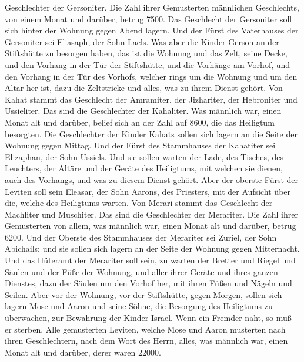 Geschlechter der Gersoniter.  Die Zahl ihrer Gemusterten
männlichen Geschlechts, von einem Monat und darüber, betrug 7500.
 Das Geschlecht der Gersoniter soll sich hinter der
Wohnung gegen Abend lagern.  Und der Fürst des
Vaterhauses der Gersoniter sei Eliasaph, der Sohn Laels. 
Was aber die Kinder Gerson an der Stiftshütte zu besorgen haben, das ist
die Wohnung und das Zelt, seine Decke, und den Vorhang in der Tür der
Stiftshütte,  und die Vorhänge am Vorhof, und den Vorhang
in der Tür des Vorhofs, welcher rings um die Wohnung und um den Altar
her ist, dazu die Zeltstricke und alles, was zu ihrem Dienst gehört.
 Von Kahat stammt das Geschlecht der Amramiter, der
Jizhariter, der Hebroniter und Ussieliter. Das sind die Geschlechter der
Kahaliter.  Was männlich war, einen Monat alt und
darüber, belief sich an der Zahl auf 8600, die das Heiligtum besorgten.
 Die Geschlechter der Kinder Kahats sollen sich lagern an
die Seite der Wohnung gegen Mittag.  Und der Fürst des
Stammhauses der Kahatiter sei Elizaphan, der Sohn Ussiels.
 Und sie sollen warten der Lade, des Tisches, des
Leuchters, der Altäre und der Geräte des Heiligtums, mit welchen sie
dienen, auch des Vorhangs, und was zu diesem Dienst gehört.
 Aber der oberste Fürst der Leviten soll sein Eleasar,
der Sohn Aarons, des Priesters, mit der Aufsicht über die, welche des
Heiligtums warten.  Von Merari stammt das Geschlecht der
Machliter und Muschiter. Das sind die Geschlechter der Merariter.
 Die Zahl ihrer Gemusterten von allem, was männlich war,
einen Monat alt und darüber, betrug 6200.  Und der
Oberste des Stammhauses der Merariter sei Zuriel, der Sohn Abichails;
und sie sollen sich lagern an der Seite der Wohnung gegen Mitternacht.
 Und das Hüteramt der Merariter soll sein, zu warten der
Bretter und Riegel und Säulen und der Füße der Wohnung, und aller ihrer
Geräte und ihres ganzen Dienstes,  dazu der Säulen um den
Vorhof her, mit ihren Füßen und Nägeln und Seilen.  Aber
vor der Wohnung, vor der Stiftshütte, gegen Morgen, sollen sich lagern
Mose und Aaron und seine Söhne, die Besorgung des Heiligtums zu
überwachen, zur Bewahrung der Kinder Israel. Wenn ein Fremder naht, so
muß er sterben.  Alle gemusterten Leviten, welche Mose
und Aaron musterten nach ihren Geschlechtern, nach dem Wort des Herrn,
alles, was männlich war, einen Monat alt und darüber, derer waren 22000.
